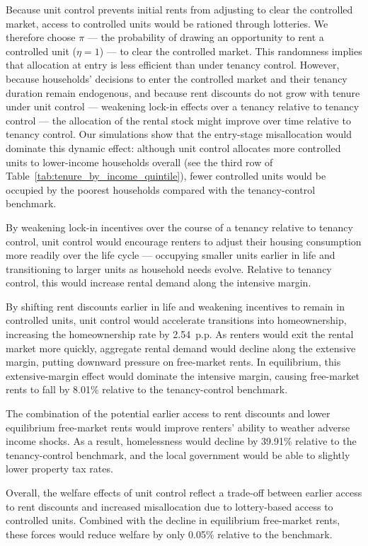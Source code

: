 \documentclass[parskip=full]{article}
\begin{document}
Because unit control prevents initial rents from adjusting to clear the controlled market, access to controlled units would be rationed through lotteries. We therefore choose $\pi$ — the probability of drawing an opportunity to rent a controlled unit ($\eta=1$) — to clear the controlled market. This randomness implies that allocation at entry is less efficient than under tenancy control. However, because households’ decisions to enter the controlled market and their tenancy duration remain endogenous, and because rent discounts do not grow with tenure under unit control — weakening lock-in effects over a tenancy relative to tenancy control — the allocation of the rental stock might improve over time relative to tenancy control. Our simulations show that the entry-stage misallocation would dominate this dynamic effect: although unit control allocates more controlled units to lower-income households overall (see the third row of Table~\ref{tab:tenure_by_income_quintile}), fewer controlled units would be occupied by the poorest households compared with the tenancy-control benchmark.

By weakening lock-in incentives over the course of a tenancy relative to tenancy control, unit control would encourage renters to adjust their housing consumption more readily over the life cycle — occupying smaller units earlier in life and transitioning to larger units as household needs evolve. Relative to tenancy control, this would increase rental demand along the intensive margin.

By shifting rent discounts earlier in life and weakening incentives to remain in controlled units, unit control would accelerate transitions into homeownership, increasing the homeownership rate by 2.54~p.p. As renters would exit the rental market more quickly, aggregate rental demand would decline along the extensive margin, putting downward pressure on free-market rents. In equilibrium, this extensive-margin effect would dominate the intensive margin, causing free-market rents to fall by 8.01\% relative to the tenancy-control benchmark.

The combination of the potential earlier access to rent discounts and lower equilibrium free-market rents would improve renters’ ability to weather adverse income shocks. As a result, homelessness would decline by 39.91\% relative to the tenancy-control benchmark, and the local government would be able to slightly lower property tax rates.

Overall, the welfare effects of unit control reflect a trade-off between earlier access to rent discounts and increased misallocation due to lottery-based access to controlled units. Combined with the decline in equilibrium free-market rents, these forces would reduce welfare by only 0.05\% relative to the benchmark.
\end{document}
